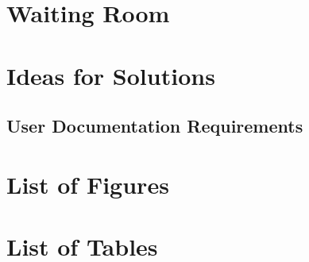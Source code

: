 \documentclass{article}
\begin{document}
\section{Waiting Room}


\section{Ideas for Solutions}

\subsection{User Documentation Requirements}


\section*{List of Figures}
\listoffigures

\section*{List of Tables}
\listoftables
\end{document}
